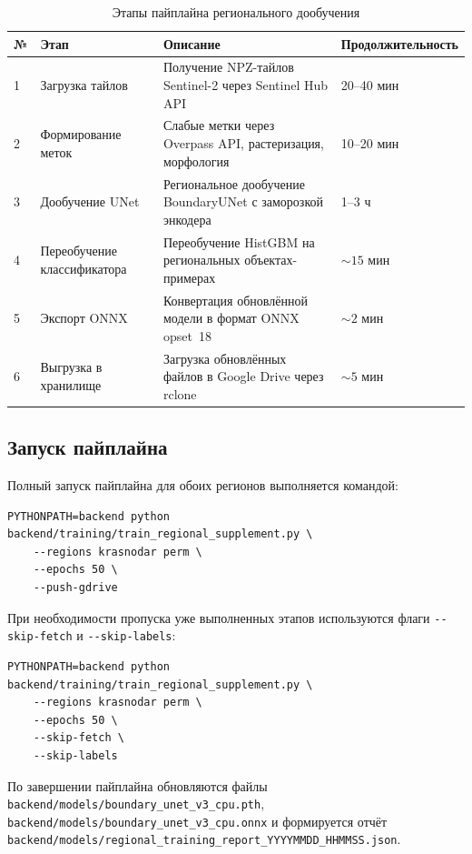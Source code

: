 \documentclass[14pt,a4paper]{extarticle}
\newcommand{\tbl}[1]{\texttt{#1}}  %
\begin{document}
\begin{table}[h!]
\caption{Этапы пайплайна регионального дообучения}
\label{tab:pipeline_stages}
\begin{tabularx}{\textwidth}{C{6mm}L{46mm}L{54mm}X}
\toprule
\textbf{№} & \textbf{Этап} & \textbf{Описание} & \textbf{Продолжительность} \\
 & Загрузка тайлов            & Получение NPZ-тайлов Sentinel-2 через Sentinel Hub API     & 20--40 мин \\
2 & Формирование меток         & Слабые метки через Overpass API, растеризация, морфология  & 10--20 мин \\
3 & Дообучение UNet            & Региональное дообучение BoundaryUNet с заморозкой энкодера & 1--3 ч \\
4 & Переобучение классификатора& Переобучение HistGBM на региональных объектах-примерах     & ${\sim}15$ мин \\
5 & Экспорт ONNX               & Конвертация обновлённой модели в формат ONNX opset~18      & ${\sim}2$ мин \\
6 & Выгрузка в хранилище       & Загрузка обновлённых файлов в Google Drive через rclone    & ${\sim}5$ мин \\
\bottomrule
\end{tabularx}
\end{table}

\subsection{Запуск пайплайна}

Полный запуск пайплайна для обоих регионов выполняется командой:

\begin{lstlisting}
PYTHONPATH=backend python backend/training/train_regional_supplement.py \
    --regions krasnodar perm \
    --epochs 50 \
    --push-gdrive
\end{lstlisting}

При необходимости пропуска уже выполненных этапов используются флаги
\tbl{{-}{-}skip-fetch} и \tbl{{-}{-}skip-labels}:

\begin{lstlisting}
PYTHONPATH=backend python backend/training/train_regional_supplement.py \
    --regions krasnodar perm \
    --epochs 50 \
    --skip-fetch \
    --skip-labels
\end{lstlisting}

По завершении пайплайна обновляются файлы
\tbl{backend/models/boundary\_unet\_v3\_cpu.pth},
\tbl{backend/models/boundary\_unet\_v3\_cpu.onnx}
и формируется отчёт
\tbl{backend/models/regional\_training\_report\_YYYYMMDD\_HHMMSS.json}.
\end{document}
